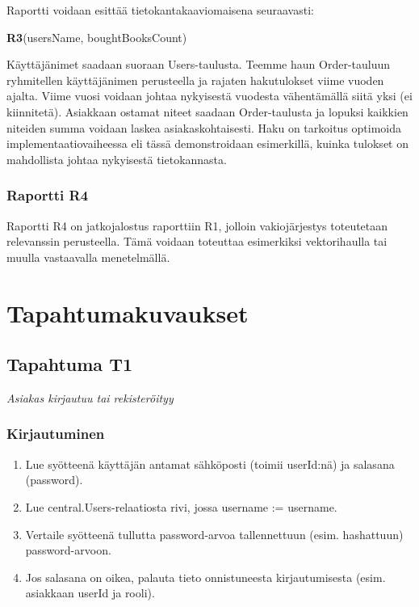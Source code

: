 \documentclass[11pt,a4paper]{article}
\begin{document}
Raportti voidaan esittää tietokantakaaviomaisena seuraavasti:

\textbf{R3}(usersName, boughtBooksCount)

Käyttäjänimet saadaan suoraan Users-taulusta. Teemme haun Order-tauluun ryhmitellen käyttäjänimen perusteella ja rajaten hakutulokset viime vuoden ajalta. Viime vuosi voidaan johtaa nykyisestä vuodesta vähentämällä siitä yksi (ei kiinnitetä). Asiakkaan ostamat niteet saadaan Order-taulusta ja lopuksi kaikkien niteiden summa voidaan laskea asiakaskohtaisesti. Haku on tarkoitus optimoida implementaatiovaiheessa eli tässä demonstroidaan esimerkillä, kuinka tulokset on mahdollista johtaa nykyisestä tietokannasta.

\subsubsection{Raportti R4}

Raportti R4 on jatkojalostus raporttiin R1, jolloin vakiojärjestys toteutetaan relevanssin perusteella. Tämä voidaan toteuttaa esimerkiksi vektorihaulla tai muulla vastaavalla menetelmällä.

\section{Tapahtumakuvaukset}

\subsection{Tapahtuma T1}
{\large{\textit{Asiakas kirjautuu tai rekisteröityy}}}

\subsubsection{Kirjautuminen}

\begin{enumerate}
	\item Lue syötteenä käyttäjän antamat sähköposti (toimii userId:nä) ja salasana (password).
	\item Lue central.Users-relaatiosta rivi, jossa username := username.
	\item Vertaile syötteenä tullutta password-arvoa tallennettuun (esim. hashattuun) password-arvoon.
	\item Jos salasana on oikea, palauta tieto onnistuneesta kirjautumisesta (esim. asiakkaan userId ja rooli).
\end{enumerate}
\end{document}
